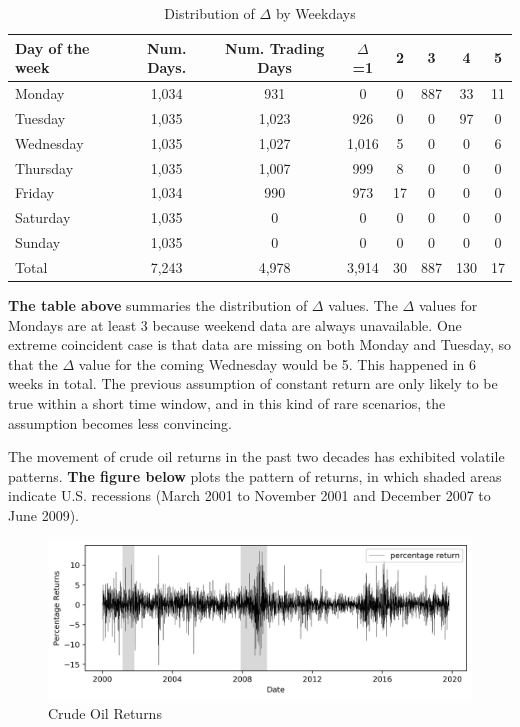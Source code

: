 \documentclass[12pt]{article}
\begin{document}
	\begin{table}[H]
		\centering
		\small
		\caption{Distribution of $\Delta$ by Weekdays}
		\begin{tabular}{l|c c c c c c c}
			\toprule
			Day of the week & Num. Days. & Num. Trading Days & $\Delta$=1 & 2 & 3 & 4 & 5 \\
			\midrule
Monday & 1,034 & 931 & 0 & 0 & 887 & 33 & 11 \\
Tuesday & 1,035 & 1,023 & 926 & 0 & 0 & 97 & 0 \\
Wednesday & 1,035 & 1,027 & 1,016 & 5 & 0 & 0 & 6 \\
Thursday & 1,035 & 1,007 & 999 & 8 & 0 & 0 & 0 \\
Friday & 1,034 & 990 & 973 & 17 & 0 & 0 & 0 \\
Saturday & 1,035 & 0 & 0 & 0 & 0 & 0 & 0 \\
Sunday & 1,035 & 0 & 0 & 0 & 0 & 0 & 0 \\
\midrule
Total & 7,243 & 4,978 & 3,914 & 30 & 887 & 130 & 17 \\
			\bottomrule
		\end{tabular}
	\end{table}

	\par \textbf{The table above} summaries the distribution of $\Delta$ values. The $\Delta$ values for Mondays are at least 3 because weekend data are always unavailable. One extreme coincident case is that data are missing on both Monday and Tuesday, so that the $\Delta$ value for the coming Wednesday would be 5. This happened in 6 weeks in total.
	The previous assumption of constant return are only likely to be true within a short time window, and in this kind of rare scenarios, the assumption becomes less convincing.
	
	\par The movement of crude oil returns in the past two decades has exhibited volatile patterns. \textbf{The figure below} plots the pattern of returns, in which shaded areas indicate U.S. recessions (March 2001 to November 2001 and December 2007 to June 2009). 
	\begin{figure}[H]
		\centering
		\small
		\caption{Crude Oil Returns}
		\includegraphics[width=\linewidth]{figures/wti_summary/returns.png}
	\end{figure}
	
\end{document}
